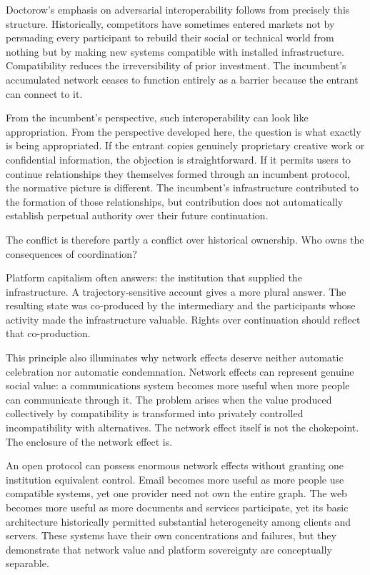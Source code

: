 \documentclass[11pt]{article}
\begin{document}
Doctorow's emphasis on adversarial interoperability follows from precisely this structure. Historically, competitors have sometimes entered markets not by persuading every participant to rebuild their social or technical world from nothing but by making new systems compatible with installed infrastructure. Compatibility reduces the irreversibility of prior investment. The incumbent's accumulated network ceases to function entirely as a barrier because the entrant can connect to it.

From the incumbent's perspective, such interoperability can look like appropriation. From the perspective developed here, the question is what exactly is being appropriated. If the entrant copies genuinely proprietary creative work or confidential information, the objection is straightforward. If it permits users to continue relationships they themselves formed through an incumbent protocol, the normative picture is different. The incumbent's infrastructure contributed to the formation of those relationships, but contribution does not automatically establish perpetual authority over their future continuation.

The conflict is therefore partly a conflict over historical ownership. Who owns the consequences of coordination?

Platform capitalism often answers: the institution that supplied the infrastructure. A trajectory-sensitive account gives a more plural answer. The resulting state was co-produced by the intermediary and the participants whose activity made the infrastructure valuable. Rights over continuation should reflect that co-production.

This principle also illuminates why network effects deserve neither automatic celebration nor automatic condemnation. Network effects can represent genuine social value: a communications system becomes more useful when more people can communicate through it. The problem arises when the value produced collectively by compatibility is transformed into privately controlled incompatibility with alternatives. The network effect itself is not the chokepoint. The enclosure of the network effect is.

An open protocol can possess enormous network effects without granting one institution equivalent control. Email becomes more useful as more people use compatible systems, yet one provider need not own the entire graph. The web becomes more useful as more documents and services participate, yet its basic architecture historically permitted substantial heterogeneity among clients and servers. These systems have their own concentrations and failures, but they demonstrate that network value and platform sovereignty are conceptually separable.
\end{document}
